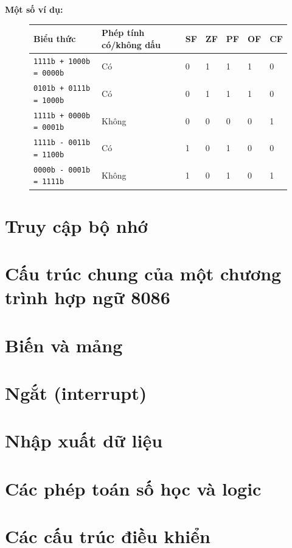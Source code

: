 \documentclass[12pt]{report}
\newcommand{\code}[1]{\texttt{#1}}
\begin{document}
\textbf{Một số ví dụ:} 
\begin{figure}[H]
    \centering
    \begin{tabular}{|l|l|l|l|l|l|l|}
    \hline
    Biểu thức & Phép tính có/không dấu & SF & ZF & PF & OF & CF \\
    \hline
    \code{1111b + 1000b = 0000b} & Có    & 0  & 1  & 1  & 1  & 0 \\
    \code{0101b + 0111b = 1000b} & Có    & 0  & 1  & 1  & 1  & 0 \\
    \code{1111b + 0000b = 0001b} & Không & 0  & 0  & 0  & 0  & 1 \\
    \code{1111b - 0011b = 1100b} & Có    & 1  & 0  & 1  & 0  & 0 \\
    \code{0000b - 0001b = 1111b} & Không & 1  & 0  & 1  & 0  & 1 \\
    \hline
    \end{tabular}
\end{figure}




\section{Truy cập bộ nhớ}


\section{Cấu trúc chung của một chương trình hợp ngữ 8086}

\section{Biến và mảng}

\section{Ngắt (interrupt)}

\section{Nhập xuất dữ liệu}

\section{Các phép toán số học và logic}

\section{Các cấu trúc điều khiển}
\end{document}
